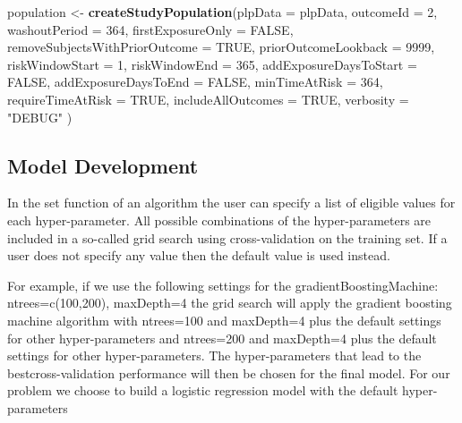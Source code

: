 \documentclass[11pt]{book}
\newenvironment{Shaded}{\begin{snugshade}}{\end{snugshade}}
\newcommand{\KeywordTok}[1]{\textcolor[rgb]{0.13,0.29,0.53}{\textbf{#1}}}
\newcommand{\DataTypeTok}[1]{\textcolor[rgb]{0.13,0.29,0.53}{#1}}
\newcommand{\DecValTok}[1]{\textcolor[rgb]{0.00,0.00,0.81}{#1}}
\newcommand{\StringTok}[1]{\textcolor[rgb]{0.31,0.60,0.02}{#1}}
\newcommand{\OtherTok}[1]{\textcolor[rgb]{0.56,0.35,0.01}{#1}}
\newcommand{\NormalTok}[1]{#1}
\begin{document}
\begin{Shaded}
\begin{Highlighting}[]
\NormalTok{population <-}\StringTok{ }\KeywordTok{createStudyPopulation}\NormalTok{(}\DataTypeTok{plpData =}\NormalTok{ plpData,}
                                    \DataTypeTok{outcomeId =} \DecValTok{2}\NormalTok{,}
                                    \DataTypeTok{washoutPeriod =} \DecValTok{364}\NormalTok{,}
                                    \DataTypeTok{firstExposureOnly =} \OtherTok{FALSE}\NormalTok{,}
                                    \DataTypeTok{removeSubjectsWithPriorOutcome =} \OtherTok{TRUE}\NormalTok{,}
                                    \DataTypeTok{priorOutcomeLookback =} \DecValTok{9999}\NormalTok{,}
                                    \DataTypeTok{riskWindowStart =} \DecValTok{1}\NormalTok{,}
                                    \DataTypeTok{riskWindowEnd =} \DecValTok{365}\NormalTok{,}
                                    \DataTypeTok{addExposureDaysToStart =} \OtherTok{FALSE}\NormalTok{,}
                                    \DataTypeTok{addExposureDaysToEnd =} \OtherTok{FALSE}\NormalTok{,}
                                    \DataTypeTok{minTimeAtRisk =} \DecValTok{364}\NormalTok{,}
                                    \DataTypeTok{requireTimeAtRisk =} \OtherTok{TRUE}\NormalTok{,}
                                    \DataTypeTok{includeAllOutcomes =} \OtherTok{TRUE}\NormalTok{,}
                                    \DataTypeTok{verbosity =} \StringTok{"DEBUG"}
\NormalTok{)}
\end{Highlighting}
\end{Shaded}

\subsection{Model Development}\label{model-development}

In the set function of an algorithm the user can specify a list of
eligible values for each hyper-parameter. All possible combinations of
the hyper-parameters are included in a so-called grid search using
cross-validation on the training set. If a user does not specify any
value then the default value is used instead.

For example, if we use the following settings for the
gradientBoostingMachine: ntrees=c(100,200), maxDepth=4 the grid search
will apply the gradient boosting machine algorithm with ntrees=100 and
maxDepth=4 plus the default settings for other hyper-parameters and
ntrees=200 and maxDepth=4 plus the default settings for other
hyper-parameters. The hyper-parameters that lead to the
bestcross-validation performance will then be chosen for the final
model. For our problem we choose to build a logistic regression model
with the default hyper-parameters
\end{document}

